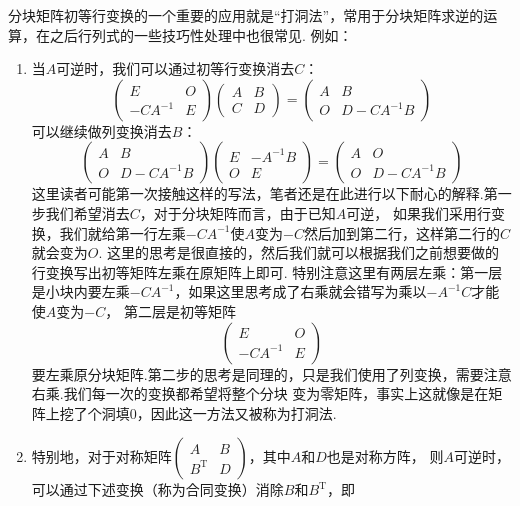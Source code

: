 分块矩阵初等行变换的一个重要的应用就是``打洞法''，常用于分块矩阵求逆的运算，在之后行列式的一些技巧性处理中也很常见.
例如：
\begin{enumerate}
    \item 当$A$可逆时，我们可以通过初等行变换消去$C$：
    \[ \begin{pmatrix}
        E & O \\ -CA^{-1} & E
    \end{pmatrix}\begin{pmatrix}
        A & B \\ C & D
    \end{pmatrix}=\begin{pmatrix}
        A & B \\ O & D-CA^{-1}B
    \end{pmatrix} \]
    可以继续做列变换消去$B$：
    \[ \begin{pmatrix}
        A & B \\ O & D-CA^{-1}B
    \end{pmatrix}\begin{pmatrix}
        E & -A^{-1}B \\ O & E
    \end{pmatrix}=\begin{pmatrix}
        A & O \\ O & D-CA^{-1}B
    \end{pmatrix} \]
    这里读者可能第一次接触这样的写法，笔者还是在此进行以下耐心的解释.第一步我们希望消去$C$，对于分块矩阵而言，由于已知$A$可逆，
    如果我们采用行变换，我们就给第一行左乘$-CA^{-1}$使$A$变为$-C$然后加到第二行，这样第二行的$C$就会变为$O$.
    这里的思考是很直接的，然后我们就可以根据我们之前想要做的行变换写出初等矩阵左乘在原矩阵上即可.
    特别注意这里有两层左乘：第一层是小块内要左乘$-CA^{-1}$，如果这里思考成了右乘就会错写为乘以$-A^{-1}C$才能使$A$变为$-C$，
    第二层是初等矩阵
    \[\begin{pmatrix}
        E & O \\ -CA^{-1} & E
    \end{pmatrix}\]要左乘原分块矩阵.第二步的思考是同理的，只是我们使用了列变换，需要注意右乘.我们每一次的变换都希望将整个分块
    变为零矩阵，事实上这就像是在矩阵上挖了个洞填0，因此这一方法又被称为打洞法.
    \item 特别地，对于对称矩阵$\begin{pmatrix}A & B \\ B^\mathrm{T} & D\end{pmatrix}$，其中$A$和$D$也是对称方阵，
    则$A$可逆时，可以通过下述变换（称为合同变换）消除$B$和$B^\mathrm{T}$，即

\end{enumerate}
